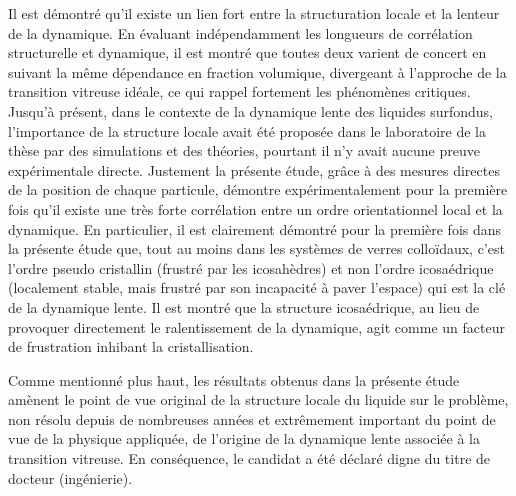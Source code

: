 \documentclass[10pt,a4paper]{article}
\begin{document}
Il est démontré qu'il existe un lien fort entre la structuration locale et la lenteur de la dynamique. En évaluant indépendamment les longueurs de corrélation structurelle et dynamique, il est montré que toutes deux varient de concert en suivant la même dépendance en fraction volumique, divergeant à l'approche de la transition vitreuse idéale, ce qui rappel fortement les phénomènes critiques. Jusqu'à présent, dans le contexte de la dynamique lente des liquides surfondus, l'importance de la structure locale avait été proposée dans le laboratoire de la thèse par des simulations et des théories, pourtant il n'y avait aucune preuve expérimentale directe. Justement la présente étude, grâce à des mesures directes de la position de chaque particule, démontre expérimentalement pour la première fois qu'il existe une très forte corrélation entre un ordre orientationnel local et la dynamique. En particulier, il est clairement démontré pour la première fois dans la présente étude que, tout au moins dans les systèmes de verres colloïdaux, c'est l'ordre pseudo cristallin (frustré par les icosahèdres) et non l'ordre icosaédrique (localement stable, mais frustré par son incapacité à paver l'espace) qui est la clé de la dynamique lente. Il est montré que la structure icosaédrique, au lieu de provoquer directement le ralentissement de la dynamique, agit comme un facteur de frustration inhibant la cristallisation.

\bigskip

Comme mentionné plus haut, les résultats obtenus dans la présente étude amènent le point de vue original de la structure locale du liquide sur le problème, non résolu depuis de nombreuses années et extrêmement important du point de vue de la physique appliquée, de l'origine de la dynamique lente associée à la transition vitreuse. En conséquence, le candidat a été déclaré digne du titre de docteur (ingénierie).


\end{document}
